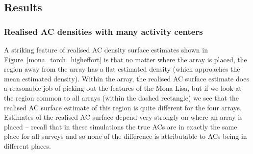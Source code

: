 \documentclass[10pt,a4paper]{article}
\begin{document}

\subsection{Results}

\subsubsection{Realised AC densities with many activity centers}


A striking feature of realised AC density surface estimates shown in Figure~\ref{mona_torch_higheffort} is that no matter where the array is placed, the region away from the array has a flat estimated density (which approaches the mean estimated density). Within the array, the realised AC surface estimate does a reasonable job of picking out the features of the Mona Lisa, but if we look at the region common to all arrays (within the dashed rectangle) we see that the realised AC surface estimate of this region is quite different for the four arrays. Estimates of the realised AC surface depend very strongly on where an array is placed -- recall that in these simulations the true ACs are in exactly the same place for all surveys and so none of the difference is attributable to ACs being in different places.
\end{document}
